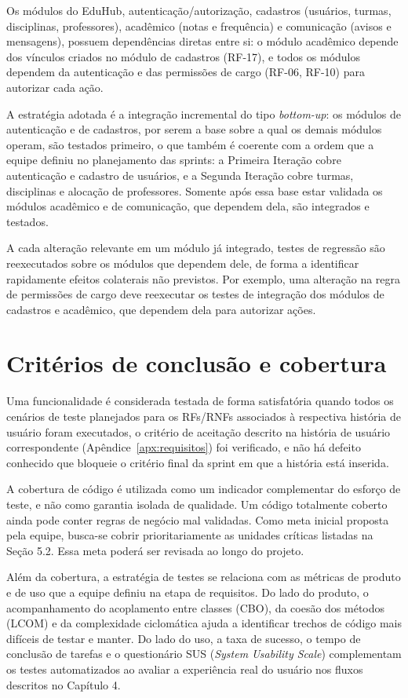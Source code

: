 Os módulos do EduHub, autenticação/autorização, cadastros (usuários,
turmas, disciplinas, professores), acadêmico (notas e frequência) e
comunicação (avisos e mensagens), possuem dependências diretas entre si: o
módulo acadêmico depende dos vínculos criados no módulo de cadastros
(RF-17), e todos os módulos dependem da autenticação e das permissões de
cargo (RF-06, RF-10) para autorizar cada ação.

A estratégia adotada é a integração incremental do tipo \textit{bottom-up}:
os módulos de autenticação e de cadastros, por serem a base sobre a qual os
demais módulos operam, são testados primeiro, o que também é coerente com
a ordem que a equipe definiu no planejamento das sprints: a Primeira
Iteração cobre autenticação e cadastro de usuários, e a Segunda Iteração
cobre turmas, disciplinas e alocação de professores. Somente após essa base
estar validada os módulos acadêmico e de comunicação, que dependem dela, são
integrados e testados.

A cada alteração relevante em um módulo já integrado, testes de regressão
são reexecutados sobre os módulos que dependem dele, de forma a identificar
rapidamente efeitos colaterais não previstos. Por exemplo, uma alteração
na regra de permissões de cargo deve reexecutar os testes de integração dos
módulos de cadastros e acadêmico, que dependem dela para autorizar ações.

\section{Critérios de conclusão e cobertura}

Uma funcionalidade é considerada testada de forma satisfatória quando todos
os cenários de teste planejados para os RFs/RNFs associados à respectiva
história de usuário foram executados, o critério de aceitação descrito na
história de usuário correspondente (Apêndice~\ref{apx:requisitos}) foi
verificado, e não há defeito conhecido que bloqueie o critério final da
sprint em que a história está inserida.

A cobertura de código é utilizada como um indicador complementar do esforço
de teste, e não como garantia isolada de qualidade. Um código totalmente
coberto ainda pode conter regras de negócio mal validadas. Como meta
inicial proposta pela equipe, busca-se cobrir prioritariamente as unidades
críticas listadas na Seção 5.2. Essa meta poderá ser revisada ao longo do
projeto.

Além da cobertura, a estratégia de testes se relaciona com as métricas de
produto e de uso que a equipe definiu na etapa de requisitos. Do lado do
produto, o acompanhamento do acoplamento entre classes (CBO), da coesão dos
métodos (LCOM) e da complexidade ciclomática ajuda a identificar trechos de
código mais difíceis de testar e manter. Do lado do uso, a taxa de sucesso,
o tempo de conclusão de tarefas e o questionário SUS (\textit{System
Usability Scale}) complementam os testes automatizados ao avaliar a
experiência real do usuário nos fluxos descritos no Capítulo 4.

